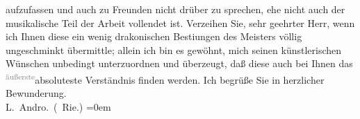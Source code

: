 \begin{ledgroupsized}[t]{13cm}
                    aufzufassen und auch zu Freunden nicht drüber zu sprechen, ehe nicht auch der
                    musikalische Teil der Arbeit vollendet ist.\pend
           \pstart
           Verzeihen Sie, sehr geehrter Herr, wenn ich Ihnen diese ein wenig drakonischen
                        Besti{\geminationm}ungen des Meisters völlig ungeschminkt übermittle; allein ich
                    bin es gewöhnt, mich seinen künstlerischen Wünschen unbedingt unterzuordnen und
                    überzeugt, daß diese auch bei Ihnen das {\pb}\substVorne{}\textsuperscript{\textcolor{gray}{äußerste}}{\allowbreak}\substDazwischen{}absoluteste\substHinten{} Verständnis finden werden.\pend
           \pstart
           Ich begrüße Sie in herzlicher Bewunderung.{\\[\baselineskip]}\spacefill\mbox{L. Andro. (\label{K_L02569-1v}\label{K_L02569-1h} Rie.)}\pend
           \leftskip=0em{}\endnumbering{}\end{ledgroupsized}  \newcommand{\dateiname}{L02569}\newcommand{\titel}{Therese Rie-Andro an Arthur Schnitzler, 6. 2. 1912}\newcommand{\editorInnen}{Martin Anton Müller und Gerd-Hermann Susen}
            \footnotesize
\begin{ledgroupsized}[t]{11.5cm}
\end{ledgroupsized}
         
      
